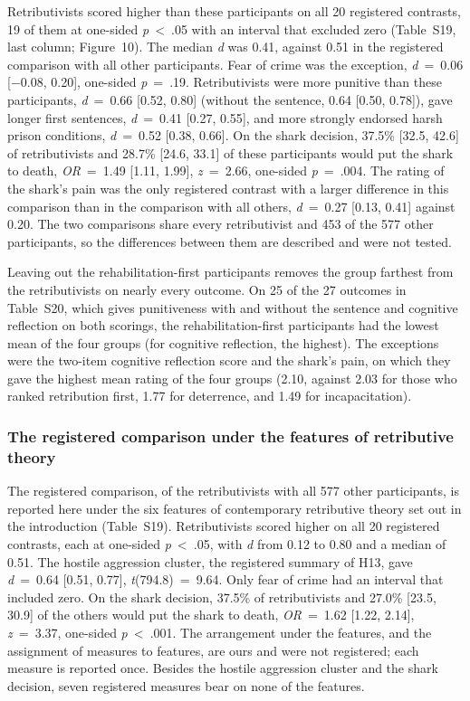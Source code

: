 Retributivists scored higher than these participants on all 20 registered contrasts, 19 of them at one-sided \emph{p}~\textless{}~.05 with an interval that excluded zero (Table~S19, last column; Figure~10). The median \emph{d} was 0.41, against 0.51 in the registered comparison with all other participants. Fear of crime was the exception, \emph{d}~=~0.06 {[}−0.08, 0.20{]}, one-sided \emph{p}~=~.19. Retributivists were more punitive than these participants, \emph{d}~=~0.66 {[}0.52, 0.80{]} (without the sentence, 0.64 {[}0.50, 0.78{]}), gave longer first sentences, \emph{d}~=~0.41 {[}0.27, 0.55{]}, and more strongly endorsed harsh prison conditions, \emph{d}~=~0.52 {[}0.38, 0.66{]}. On the shark decision, 37.5\% {[}32.5, 42.6{]} of retributivists and 28.7\% {[}24.6, 33.1{]} of these participants would put the shark to death, \emph{OR}~=~1.49 {[}1.11, 1.99{]}, \emph{z}~=~2.66, one-sided \emph{p}~=~.004. The rating of the shark's pain was the only registered contrast with a larger difference in this comparison than in the comparison with all others, \emph{d}~=~0.27 {[}0.13, 0.41{]} against 0.20. The two comparisons share every retributivist and 453 of the 577 other participants, so the differences between them are described and were not tested.

Leaving out the rehabilitation-first participants removes the group farthest from the retributivists on nearly every outcome. On 25 of the 27 outcomes in Table~S20, which gives punitiveness with and without the sentence and cognitive reflection on both scorings, the rehabilitation-first participants had the lowest mean of the four groups (for cognitive reflection, the highest). The exceptions were the two-item cognitive reflection score and the shark's pain, on which they gave the highest mean rating of the four groups (2.10, against 2.03 for those who ranked retribution first, 1.77 for deterrence, and 1.49 for incapacitation).

\subsubsection{The registered comparison under the features of retributive theory}\label{the-registered-comparison-under-the-features-of-retributive-theory}

The registered comparison, of the retributivists with all 577 other participants, is reported here under the six features of contemporary retributive theory set out in the introduction (Table~S19). Retributivists scored higher on all 20 registered contrasts, each at one-sided \emph{p}~\textless{}~.05, with \emph{d} from 0.12 to 0.80 and a median of 0.51. The hostile aggression cluster, the registered summary of H13, gave \emph{d}~=~0.64 {[}0.51, 0.77{]}, \emph{t}(794.8)~=~9.64. Only fear of crime had an interval that included zero. On the shark decision, 37.5\% of retributivists and 27.0\% {[}23.5, 30.9{]} of the others would put the shark to death, \emph{OR}~=~1.62 {[}1.22, 2.14{]}, \emph{z}~=~3.37, one-sided \emph{p}~\textless{}~.001. The arrangement under the features, and the assignment of measures to features, are ours and were not registered; each measure is reported once. Besides the hostile aggression cluster and the shark decision, seven registered measures bear on none of the features.

